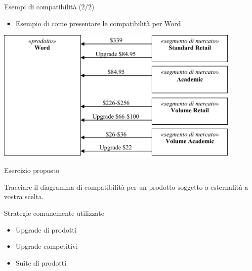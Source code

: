 \documentclass{beamer}
\begin{document}
\begin{frame}
{\centerline{Esempi di compatibilit\`{a} (2/2)}}
\begin{itemize}
    \item Esempio di come presentare le compatibilit\`{a} per Word
\end{itemize} 
\begin{center}
    \includegraphics[width=0.9\textwidth]{P2023.AIBCCSS.IlConcettoDiSoftware/EsempiCompatibilita.2.pdf}
\end{center}

\end{frame}

\begin{frame}
{\centerline{Esercizio proposto}}
\vspace{1cm}
\begin{center}
    \LARGE{Tracciare il diagramma di compatibilit\`{a} per un prodotto soggetto a esternalit\`{a} a vostra scelta.}
\end{center}

\end{frame}


\begin{frame}
{\centerline{Strategie comunemente utilizzate}}

\begin{itemize}
    \item Upgrade di prodotti
    \item Upgrade competitivi
    \item Suite di prodotti
\end{itemize}

\vspace{1cm}
\begin{center}
    
\end{center}

\end{frame}
\end{document}
